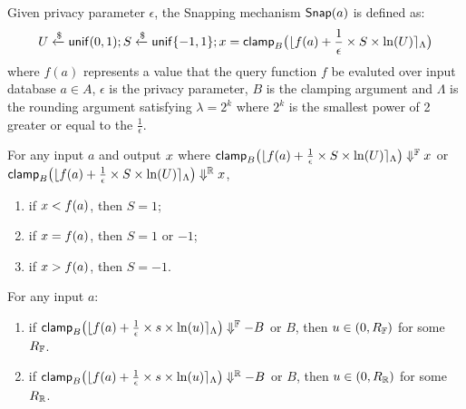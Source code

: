 \documentclass[a4paper,11pt]{article}
\begin{document}
\begin{defn}
Given privacy parameter $\epsilon$, the Snapping mechanism $\mathsf{Snap}(a)$ is defined as:
\[
	U \xleftarrow{\$} \mathsf{unif}(0,1); S \xleftarrow{\$} \mathsf{unif}\{-1, 1\};
	x = \mathsf{clamp}_B \big(
	\lfloor f(a) + \frac{1}{\epsilon} \times S \times \ln (U) \rceil_{\Lambda}
	\big)
\]
where $f(a)$ represents a value that the query function $f$ be evaluted over input database $a \in A$, $\epsilon$ is the privacy parameter, $B$ is the clamping argument and $\Lambda$ is the rounding argument satisfying $\lambda = 2^k$ where $2^k$ is the smallest power of 2 greater or equal to the $\frac{1}{\epsilon}$.
%
\end{defn}
%
%
%
\begin{lem}[sign]
\label{lem:sign}
For any input $a$ and output $x$ where
$\mathsf{clamp}_B \big(
	\lfloor f(a) + \frac{1}{\epsilon} \times S \times \ln (U) \rceil_{\Lambda}
	\big)
	\Downarrow^{\mathbb{F}} x$ 
or $\mathsf{clamp}_B \big(
	\lfloor f(a) + \frac{1}{\epsilon} \times S \times \ln (U) \rceil_{\Lambda}
	\big)
	\Downarrow^{\mathbb{R}} x$,
%
\begin{enumerate}  
	\item if $x < f(a)$, then $S = 1$;
	\item if $x = f(a)$, then $S = 1$ or $ -1$;
	\item if $x > f(a)$, then $S = -1$.
\end{enumerate}
\end{lem}
%
%
%
\begin{lem}
[clampL]
\label{lem:clampl}
For any input $a$:
\begin{enumerate}
\item 
if 
$\mathsf{clamp}_B \big(
	\lfloor f(a) + \frac{1}{\epsilon} \times s \times \ln (u) \rceil_{\Lambda}
	\big)
	\Downarrow^{\mathbb{F}} -B$ or $B$, then $u \in (0, R_{\mathbb{F}})$ for some $R_{\mathbb{F}}$.
\item
if
$\mathsf{clamp}_B \big(
	\lfloor f(a) + \frac{1}{\epsilon} \times s \times \ln (u) \rceil_{\Lambda}
	\big)
	\Downarrow^{\mathbb{R}} -B$ or $B$, then $u \in (0, R_{\mathbb{R}})$ for some $R_{\mathbb{R}}$.
\end{enumerate}
\end{lem}
\end{document}
